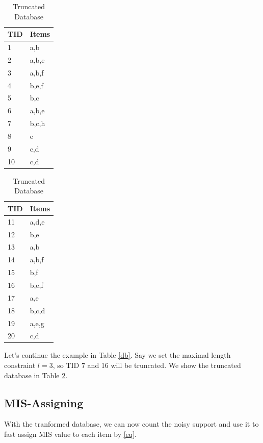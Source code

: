 \documentclass[conference]{IEEEtran}
\begin{document}
\begin{table}[htbp]
    \caption{Truncated Database}
    \centering    
    \begin{tabular}{|l|l|}
    \hline
    TID & \multicolumn{1}{c|}{Items} \\ \hline
    1   & a,b   \\ \hline
    2   & a,b,e \\ \hline
    3   & a,b,f \\ \hline
    4   & b,e,f \\ \hline
    5   & b,c   \\ \hline
    6   & a,b,e \\ \hline
    7   & b,c,h \\ \hline
    8   & e     \\ \hline
    9   & c,d   \\ \hline
    10  & c,d   \\ \hline
    \end{tabular}
    \begin{tabular}{|l|l|}
    \hline
    TID & \multicolumn{1}{c|}{Items} \\ \hline
    11  & a,d,e          \\ \hline
    12  & b,e        \\ \hline
    13  & a,b         \\ \hline
    14  & a,b,f        \\ \hline
    15  & b,f      \\ \hline
    16  & b,e,f  \\ \hline
    17  & a,e        \\ \hline
    18  & b,c,d          \\ \hline
    19  & a,e,g         \\ \hline
    20  & c,d        \\ \hline
    \end{tabular}
    \label{db2}
\end{table}

\begin{example}
    Let's continue the example in Table \ref{db}. 
    Say we set the maximal length constraint $l=3$, so TID 7 and 16 will be truncated.
    We show the truncated database in Table \ref{db2}.
\end{example} 


\subsection{MIS-Assigning}
With the tranformed database, we can now count the noisy support and use it to fast assign MIS value to each item by \eqref{eq}.
\end{document}
